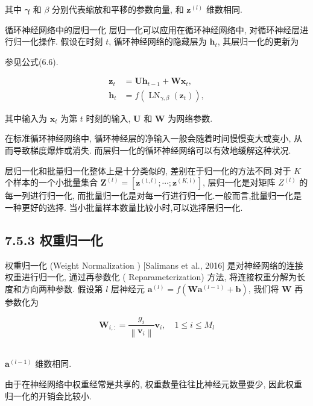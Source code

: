 \documentclass[10pt]{article}
\begin{document}
其中 $\boldsymbol{\gamma}$ 和 $\beta$ 分别代表缩放和平移的参数向量, 和 $\boldsymbol{z}^{(l)}$ 维数相同.

循环神经网络中的层归一化 层归一化可以应用在循环神经网络中, 对循环神经层进行归一化操作. 假设在时刻 $t$, 循环神经网络的隐藏层为 $\boldsymbol{h}_{t}$, 其层归一化的更新为

参见公式(6.6).


\begin{align*}
\boldsymbol{z}_{t} & =\boldsymbol{U} \boldsymbol{h}_{t-1}+\boldsymbol{W} \boldsymbol{x}_{t},  \tag{7.62}\\
\boldsymbol{h}_{t} & =f\left(\operatorname{LN}_{\gamma, \beta}\left(\boldsymbol{z}_{t}\right)\right), \tag{7.63}
\end{align*}


其中输入为 $\boldsymbol{x}_{t}$ 为第 $t$ 时刻的输入, $\boldsymbol{U}$ 和 $\boldsymbol{W}$ 为网络参数.

在标准循环神经网络中, 循环神经层的净输入一般会随着时间慢慢变大或变小, 从而导致梯度爆炸或消失. 而层归一化的循环神经网络可以有效地缓解这种状况.

层归一化和批量归一化整体上是十分类似的, 差别在于归一化的方法不同.对于 $K$ 个样本的一个小批量集合 $\boldsymbol{Z}^{(l)}=\left[\boldsymbol{z}^{(1, l)} ; \cdots ; \boldsymbol{z}^{(K, l)}\right]$, 层归一化是对矩阵 $Z^{(l)}$ 的每一列进行归一化, 而批量归一化是对每一行进行归一化.一般而言,批量归一化是一种更好的选择. 当小批量样本数量比较小时,可以选择层归一化.

\subsection*{7.5.3 权重归一化}
权重归一化 (Weight Normalization ) [Salimans et al., 2016] 是对神经网络的连接权重进行归一化, 通过再参数化 ( Reparameterization) 方法, 将连接权重分解为长度和方向两种参数. 假设第 $l$ 层神经元 $\boldsymbol{a}^{(l)}=f\left(\boldsymbol{W} \boldsymbol{a}^{(l-1)}+\boldsymbol{b}\right)$, 我们将 $\boldsymbol{W}$ 再参数化为


\begin{equation*}
\boldsymbol{W}_{i,:}=\frac{g_{i}}{\left\|\boldsymbol{v}_{i}\right\|} \boldsymbol{v}_{i}, \quad 1 \leq i \leq M_{l} \tag{7.64}
\end{equation*}


\\
$\boldsymbol{a}^{(l-1)}$ 维数相同.

由于在神经网络中权重经常是共享的, 权重数量往往比神经元数量要少, 因此权重归一化的开销会比较小.
\end{document}
